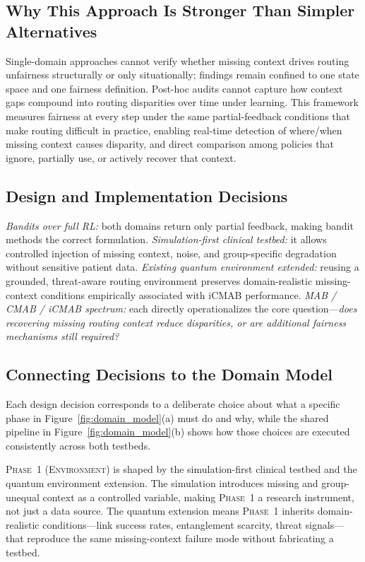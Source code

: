 \documentclass{IEEEtran}
\begin{document}
\subsection{Why This Approach Is Stronger Than Simpler Alternatives}
Single-domain approaches cannot verify whether missing context drives routing
unfairness structurally or only situationally; findings remain confined to
one state space and one fairness definition. Post-hoc audits cannot capture
how context gaps compound into routing disparities over time under learning.
This framework measures fairness at every step under the same partial-feedback
conditions that make routing difficult in practice, enabling real-time
detection of where/when missing context causes disparity, and direct
comparison among policies that ignore, partially use, or actively recover
that context.

\subsection{Design and Implementation Decisions}
\textit{Bandits over full RL:} both domains return only partial feedback,
making bandit methods the correct formulation. \textit{Simulation-first
clinical testbed:} it allows controlled injection of missing context,
noise, and group-specific degradation without sensitive patient data.
\textit{Existing quantum environment extended:} reusing a grounded,
threat-aware routing environment preserves domain-realistic missing-context
conditions empirically associated with iCMAB performance.
\textit{MAB / CMAB / iCMAB spectrum:} each directly operationalizes the core
question---\textit{does recovering missing routing context reduce disparities, or are
additional fairness mechanisms still required?}

\subsection{Connecting Decisions to the Domain Model}
Each design decision corresponds to a deliberate choice about what a specific
phase in Figure~\ref{fig:domain_model}(a) must do and why, while the shared
pipeline in Figure~\ref{fig:domain_model}(b) shows how those choices are
executed consistently across both testbeds.

\textsc{Phase~1 (Environment)} is shaped by the simulation-first clinical
testbed and the quantum environment extension. The simulation introduces
missing and group-unequal context as a controlled variable, making
\textsc{Phase~1} a research instrument, not just a data source. The quantum
extension means \textsc{Phase~1} inherits domain-realistic conditions---link success
rates, entanglement scarcity, threat signals---that reproduce the same
missing-context failure mode without fabricating a testbed.
\end{document}
